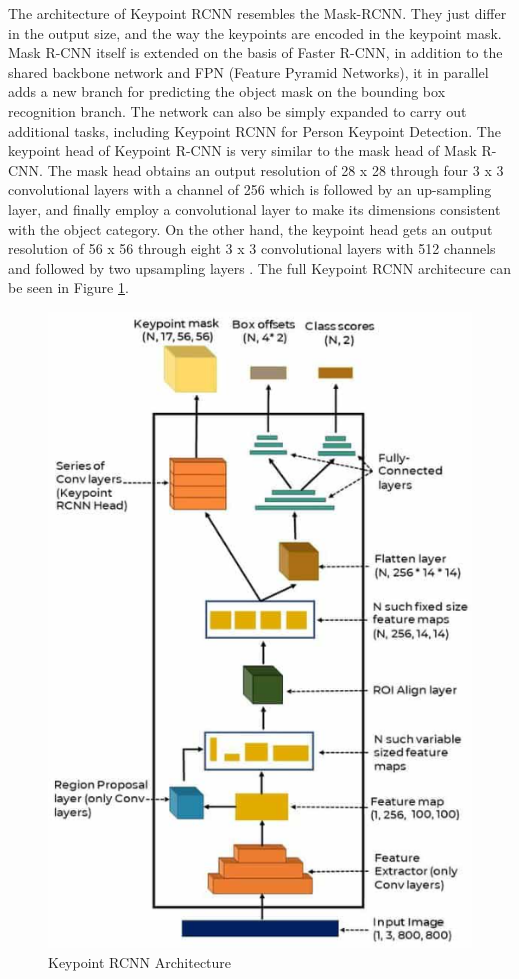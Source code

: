 The architecture of Keypoint RCNN resembles the Mask-RCNN. They just differ in the output size, and the way the keypoints are encoded in the keypoint mask. Mask R-CNN itself is extended on the basis of Faster R-CNN,
in addition to the shared backbone network and FPN (Feature Pyramid Networks), it in parallel adds a new branch for predicting the object mask on the bounding box recognition branch.
The network can also be simply expanded to carry out additional tasks, including Keypoint RCNN for Person Keypoint Detection. The keypoint head of Keypoint R-CNN is very similar to the mask head of Mask R-CNN. The mask head obtains an output resolution of
28 x 28 through four 3 x 3 convolutional layers with a channel of 256 which is followed by an up-sampling layer, and finally
employ a convolutional layer to make its dimensions consistent with the object category. On the other hand, the keypoint head gets an output resolution of 56 x 56 through eight 3 x 3 convolutional
layers with 512 channels and followed by two upsampling layers \parencite{zhang2021}.
The full Keypoint RCNN architecure can be seen in Figure \ref{fig:keypoint-rcnn-architecture}.

\begin{figure}[ht]
  \centering
  \includegraphics[scale=0.8]{gambar/keypoint-rcnn-arch.png}
  \caption{Keypoint RCNN Architecture}
  \label{fig:keypoint-rcnn-architecture}
\end{figure}


